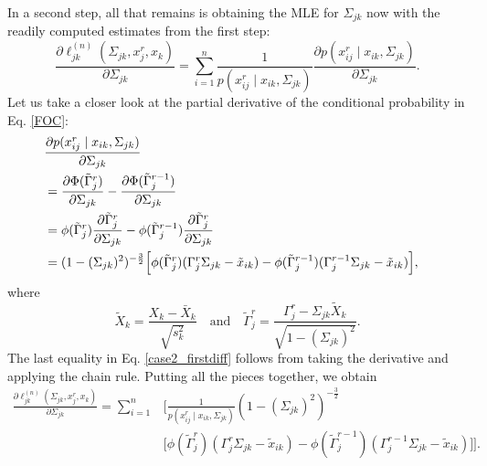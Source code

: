 In a second step, all that remains is obtaining the MLE for $\Sigma_{jk}$ now with the readily computed estimates from the first step:
\begin{equation}\label{FOC}
    \frac{\partial \ell_{jk}^{(n)}(\Sigma_{jk}, x_j^r,x_k)}{\partial \Sigma_{jk}} = \sum_{i=1}^n \frac{1}{p(x_{ij}^{r} \mid x_{ik}, \Sigma_{jk})} \frac{\partial p(x_{ij}^{r} \mid x_{ik}, \Sigma_{jk})}{\partial \Sigma_{jk}}.
\end{equation}
Let us take a closer look at the partial derivative of the conditional probability in Eq. \eqref{FOC}:
\begin{equation}\label{case2_firstdiff}
    \begin{split}
        \lefteqn{\frac{\partial p(x_{ij}^{r} \mid x_{ik}, \Sigma_{jk})}{\partial \Sigma_{jk}}} \\
        &= \frac{\partial \Phi({\tilde{\Gamma}}_j^{r})}{\partial \Sigma_{jk}} - \frac{\partial\Phi({\tilde{\Gamma}}_j^{r-1})}{\partial \Sigma_{jk}} \\
        &= \phi({\tilde{\Gamma}}_j^{r})\frac{\partial {\tilde{\Gamma}}_j^{r}}{\partial\Sigma_{jk}} - \phi({\tilde{\Gamma}}_j^{r-1})\frac{\partial {\tilde{\Gamma}}_j^{r}}{\partial\Sigma_{jk}} \\
        &= (1-(\Sigma_{jk})^2)^{-\frac{3}{2}}\Big[\phi({\tilde{\Gamma}}_j^{r})({\Gamma}_j^r\Sigma_{jk} - {\tilde{x}}_{ik}) - \phi({\tilde{\Gamma}}_j^{r-1})({\Gamma}_j^{r-1}\Sigma_{jk} - {\tilde{x}}_{ik})\Big],
    \end{split}
\end{equation}
where
\[{\tilde{X}}_{k} = \frac{X_{k} - \bar{X}_k}{\sqrt{s_k^2}} \quad \text{and} \quad {\tilde{\Gamma}}_j^{r} = \frac{{\Gamma}_j^{r} - \Sigma_{jk}{\tilde{X}}_k}{\sqrt{1-(\Sigma_{jk})^2}}.\]
The last equality in Eq. \eqref{case2_firstdiff} follows from taking the derivative and applying the chain rule. Putting all the pieces together, we obtain
\begin{equation}\label{MLE_polyserial}
    \begin{split}
        \frac{\partial\ell_{jk}^{(n)}(\Sigma_{jk}, x_j^r,x_k)}{\partial \Sigma_{jk}} = \sum_{i=1}^n &\Bigg[\frac{1}{p(x_{ij}^{r} \mid x_{ik}, \Sigma_{jk})} (1-(\Sigma_{jk})^2)^{-\frac{3}{2}} \\
        &\Big[\phi({\tilde{\Gamma}}_j^{r})({\Gamma}_j^r\Sigma_{jk} - {\tilde{x}}_{ik}) - \phi({\tilde{\Gamma}}_j^{r-1})({\Gamma}_j^{r-1}\Sigma_{jk} - {\tilde{x}}_{ik})\Big]\Bigg].
    \end{split}
\end{equation}

